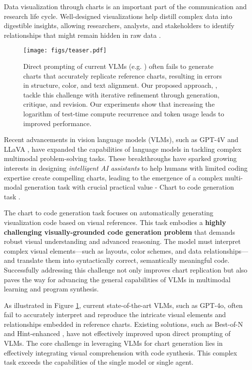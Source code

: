 Data visualization through charts is an important part of the communication and research life cycle. Well-designed visualizations help distill complex data into digestible insights, allowing researchers, analysts, and stakeholders to identify relationships that might remain hidden in raw data \citep{qin2020making, xu2023chartbench, yang2024matplotagent}.

\begin{figure}[ht]
    \centering
    \texttt{[image: figs/teaser.pdf]}
    \caption{Direct prompting of current VLMs (e.g. \gpt ) often fails to generate charts that accurately replicate reference charts, resulting in errors in structure, color, and text alignment. Our proposed approach, \model{}, tackle this challenge with iterative refinement through generation, critique, and revision. Our experiments show that increasing the logarithm of test-time compute recurrence and token usage leads to improved performance.}
    \label{fig:teaser}
    \vspace{-0.1in}
\end{figure}


Recent advancements in vision language models (VLMs), such as GPT-4V \cite{GPT4V} and LLaVA \cite{li2024llavanext-strong}, have expanded the capabilities of language models in tackling complex multimodal problem-solving tasks. These breakthroughs have sparked growing interests in designing \textit{intelligent AI assistants} to help humans with limited coding expertise create compelling charts, leading to the emergence of a complex multi-modal generation task with crucial practical value - Chart to code generation task \citep {wu2024plot2code, han2023chartllama,  shi2024chartmimic}. 

The chart to code generation task focuses on automatically generating visualization code based on visual references. This task embodies a \textbf{highly challenging visually-grounded code generation problem} that demands robust visual understanding and advanced reasoning. The model must interpret complex visual elements—such as layouts, color schemes, and data relationships—and translate them into syntactically correct, semantically meaningful code. Successfully addressing this challenge not only improves chart replication but also paves the way for advancing the general capabilities of VLMs in multimodal learning and program synthesis.

As illustrated in Figure \ref{fig:teaser}, current state-of-the-art VLMs, such as GPT-4o, often fail to accurately interpret and reproduce the intricate visual elements and relationships embedded in reference charts.  Existing solutions, such as Best-of-N and Hint-enhanced \cite{wang2024hint}, have not effectively improved upon direct prompting of VLMs. The core challenge in leveraging VLMs for chart generation lies in effectively integrating visual comprehension with code synthesis. This complex task exceeds the capabilities of the single model or single agent.

